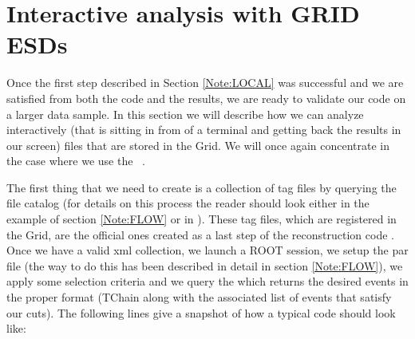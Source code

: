\section{Interactive analysis with GRID ESDs}
\label{Note:INTERACTIVE}

Once the first step described in Section \ref{Note:LOCAL} was successful and we are satisfied from both the code and the results, we are ready to validate our code on a larger data sample. In this section we will describe how we can analyze interactively (that is sitting in from of a terminal and getting back the results in our screen) files that are stored in the Grid. We will once again concentrate in the case where we use the \tag\ \cite{Note:RefIlcenTutorial,Note:RefEventTagWeb}.

The first thing that we need to create is a collection of tag files by querying the file catalog (for details on this process the reader should look either in the example of section \ref{Note:FLOW} or in \cite{Note:RefFileCatalogMetadataNote,Note:RefFileCatalogMetadataWeb}). These tag files, which are registered in the Grid, are the official ones created as a last step of the reconstruction code \cite{Note:RefEventTagNote}. Once we have a valid xml collection, we launch a ROOT session, we setup the {\ttfamily par file} (the way to do this has been described in detail in section \ref{Note:FLOW}), we apply some selection criteria and we query the \tag which returns the desired events in the proper format (TChain along with the associated list of events that satisfy our cuts). The following lines give a snapshot of how a typical code should look like:


